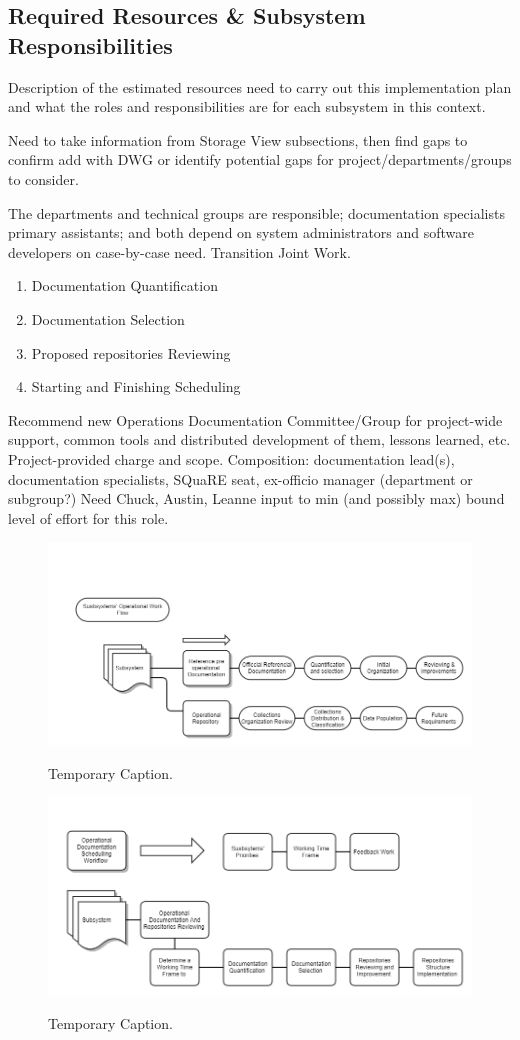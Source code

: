 \subsection{Required Resources \& Subsystem Responsibilities}

Description of the estimated resources need to carry out this implementation plan and what the roles and responsibilities are for each subsystem in this context.

Need to take information from Storage View subsections, then find gaps to confirm add with DWG or identify potential gaps for project/departments/groups to consider.

The departments and technical groups are responsible; documentation specialists primary assistants; and both depend on system administrators and software developers on case-by-case need.
Transition Joint Work.

\begin{enumerate}
	\item Documentation Quantification
	\item Documentation Selection
	\item Proposed repositories Reviewing
	\item Starting and Finishing Scheduling
\end{enumerate}

Recommend new Operations Documentation Committee/Group for project-wide support, common tools and distributed development of them, lessons learned, etc.
Project-provided charge and scope.
Composition: documentation lead(s), documentation specialists, SQuaRE seat, ex-officio manager (department or subgroup?)
Need Chuck, Austin, Leanne input to min (and possibly max) bound level of effort for this role.

\begin{figure}[t]
\caption{Temporary Caption.}
\centering
\includegraphics[width=\textwidth]{subsystems-role-workflow-temp}
\label{fig:subsystems-role-workflow}
\end{figure}

\begin{figure}[t]
\caption{Temporary Caption.}
\centering
\includegraphics[width=\textwidth]{scheduling-workflow-temp}
\label{fig:scheduling-workflow}
\end{figure}

